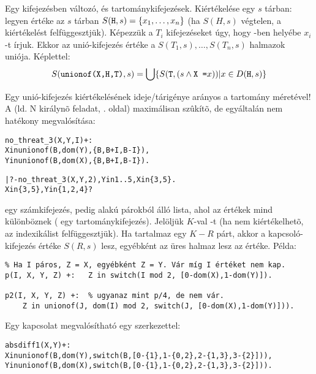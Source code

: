 \label{unio:ind}

Egy  kifejezésben  változó,  és 
tartománykifejezések. Kiértékelése egy $s$ tárban: legyen  értéke
az $s$ tárban $S(\texttt{H},s) = \{x_1, \ldots, x_n\}$ (ha $S(H,s)$ végtelen,
a kiértékelést felfüggesztjük). Képezzük a $T_i$ kifejezéseket úgy, hogy
-ben  helyébe $x_i$-t írjuk. Ekkor az unió-kifejezés értéke
a $S(T_1,s), \ldots, S(T_n,s)$ halmazok uniója. Képlettel:
\[
        S(\texttt{unionof(X,H,T)}, s) = \bigcup \{S(\texttt{T}, (s \wedge \texttt{X =}
        x)) | x \in D(\texttt{H}, s)\}
\]

Egy unió-kifejezés kiértékelésének ideje/tárigénye arányos a 
tartomány méretével!
\br
A  (ld. N királynõ feladat, \pageref{no:threat}. oldal) maximálisan
szûkítõ, de egyáltalán nem hatékony megvalósítása:

\begin{alltt}
no_threat_3(X, Y, I) +:
        X in unionof(B, dom(Y), \bs\{B,B+I,B-I\}),
        Y in unionof(B, dom(X), \bs\{B,B+I,B-I\}).

| ?- no_threat_3(X, Y, 2), Y in 1..5, X in \{3,5\}.
X in \{3,5\}, Y in \{1,2,4\} ?
\end{alltt}

\label{kapcs:ind}
 egy számkifejezés,  pedig 
alakú párokból álló lista, ahol az  értékek mind
különböznek ( egy tartománykifejezés). Jelöljük $K$-val -t
(ha  nem kiértékelhetõ, az indexikálist felfüggesztjük).
Ha  tartalmaz egy $K-R$ párt, akkor a kapcsoló-kifejezés értéke
$S(R,s)$ lesz, egyébként az üres halmaz lesz az értéke. Példa:

\begin{verbatim}
% Ha I páros, Z = X, egyébként Z = Y. Vár míg I értéket nem kap.
p(I, X, Y, Z) +:   Z in switch(I mod 2, [0-dom(X),1-dom(Y)]).

p2(I, X, Y, Z) +:  % ugyanaz mint p/4, de nem vár.
    Z in unionof(J, dom(I) mod 2, switch(J, [0-dom(X),1-dom(Y)])).
\end{verbatim}

Egy  kapcsolat megvalósítható egy  szerkezettel:

\begin{alltt}
% relation(X, [0-\{1\},1-\{0,2\},2-\{1,3\},3-\{2\}], Y) \(\Leftrightarrow |x-y|=1 x,y\in[0,3]\)
absdiff1(X, Y) +:
  X in unionof(B,dom(Y),switch(B,[0-\{1\},1-\{0,2\},2-\{1,3\},3-\{2\}])),
  Y in unionof(B,dom(X),switch(B,[0-\{1\},1-\{0,2\},2-\{1,3\},3-\{2\}])).
\end{alltt}

